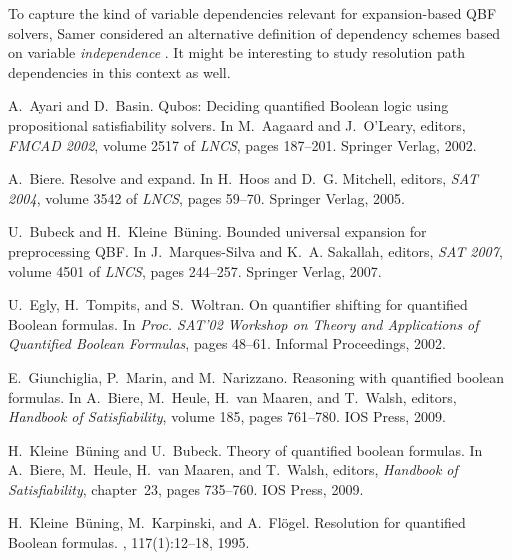 \documentclass{llncs}
\def\hy{\hbox{-}\nobreak\hskip0pt} \newcommand{\ellipsis}{}
\begin{document}
To capture the kind of variable dependencies relevant for expansion\hy based
QBF solvers, Samer considered an alternative definition of dependency schemes
based on variable \emph{independence} \cite{Samer08}. It might be interesting
to study resolution path dependencies in this context as well.
 


\begin{thebibliography}{10}

A.~Ayari and D.~Basin.
\newblock Qubos: Deciding quantified {B}oolean logic using propositional
  satisfiability solvers.
\newblock In M.~Aagaard and J.~O'Leary, editors, {\em FMCAD 2002}, volume 2517
  of {\em LNCS}, pages 187--201. Springer Verlag,
  2002.

 A.~Biere.  \newblock Resolve and expand.  \newblock In
  H.~Hoos and D.~G. Mitchell, editors, {\em SAT 2004}, volume 3542 of {\em
    LNCS}, pages 59--70. Springer Verlag, 2005.

 U.~Bubeck and H.~Kleine~B\"{u}ning.  \newblock
  Bounded universal expansion for preprocessing {QBF}.  \newblock In
  J.~Marques-Silva and K.~A. Sakallah, editors, {\em SAT 2007}, volume 4501 of
  {\em LNCS}, pages 244--257. Springer Verlag,
  2007.



U.~Egly, H.~Tompits, and S.~Woltran.
\newblock On quantifier shifting for quantified {Boolean} formulas.
\newblock In {\em Proc. SAT'02 Workshop on Theory and Applications of
  Quantified Boolean Formulas}, pages 48--61. Informal Proceedings, 2002.

E.~Giunchiglia, P.~Marin, and M.~Narizzano.
\newblock Reasoning with quantified boolean formulas.
\newblock In A.~Biere, M.~Heule, H.~van Maaren, and T.~Walsh, editors, {\em
  Handbook of Satisfiability}, volume 185, pages 761--780. IOS Press, 2009.

H.~Kleine~B{\"u}ning and U.~Bubeck.
\newblock Theory of quantified boolean formulas.
\newblock In A.~Biere, M.~Heule, H.~van Maaren, and T.~Walsh, editors, {\em
  Handbook of Satisfiability}, chapter~23, pages 735--760. IOS Press, 2009.

H.~Kleine~B\"uning, M.~Karpinski, and A.~Fl\"ogel.
\newblock Resolution for quantified {Boolean} formulas.
, 117(1):12--18, 1995.


\end{thebibliography}
\end{document}
